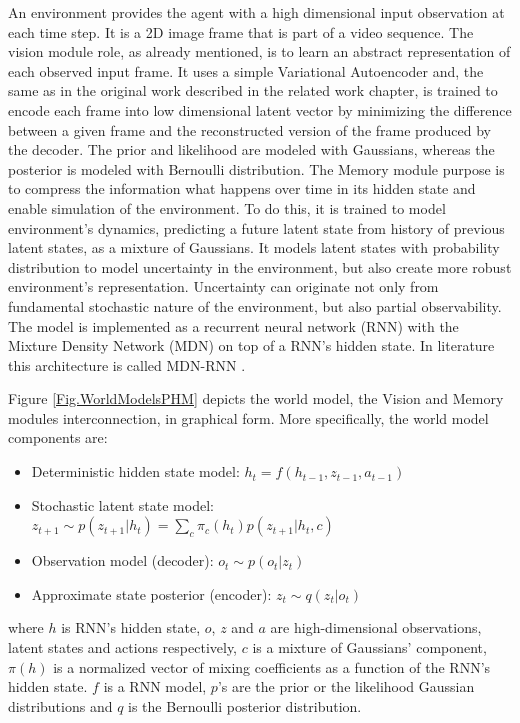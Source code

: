 An environment provides the agent with a high dimensional input observation at each time step. It is a 2D image frame that is part of a video sequence. The vision module role, as already mentioned, is to learn an abstract representation of each observed input frame. It uses a simple Variational Autoencoder \cite{Algo.VAE} and, the same as in the original work described in the related work chapter, is trained to encode each frame into low dimensional latent vector by minimizing the difference between a given frame and the reconstructed version of the frame produced by the decoder. The prior and likelihood are modeled with Gaussians, whereas the posterior is modeled with Bernoulli distribution. 
The Memory module purpose is to compress the information what happens over time in its hidden state and enable simulation of the environment. To do this, it is trained to model environment's dynamics, predicting a future latent state from history of previous latent states, as a mixture of Gaussians. It models latent states with probability distribution to model uncertainty in the environment, but also create more robust environment's representation. Uncertainty can originate not only from fundamental stochastic nature of the environment, but also partial observability. The model is implemented as a recurrent neural network (RNN) with the Mixture Density Network (MDN) on top of a RNN's hidden state. In literature this architecture is called MDN-RNN \cite{Algo.MDNRNN}.

Figure \ref{Fig.WorldModelsPHM} depicts the world model, the Vision and Memory modules interconnection, in graphical form. More specifically, the world model components are:
\begin{itemize}
\item Deterministic hidden state model:      $h_t = f(h_{t-1}, z_{t-1}, a_{t-1})$
\item Stochastic latent state model:         $z_{t+1} \sim p(z_{t+1}|h_t) = \sum_c\pi_c(h_t)p(z_{t+1}|h_t, c)$
\item Observation model (decoder):           $o_t \sim p(o_t|z_t)$
\item Approximate state posterior (encoder): $z_t \sim q(z_t|o_t)$
\end{itemize}
where $h$ is RNN's hidden state, $o$, $z$ and $a$ are high-dimensional observations, latent states and actions respectively, $c$ is a mixture of Gaussians' component, $\pi(h)$ is a normalized vector of mixing coefficients as a function of the RNN's hidden state. $f$ is a RNN model, $p$'s are the prior or the likelihood Gaussian distributions and $q$ is the Bernoulli posterior distribution.

